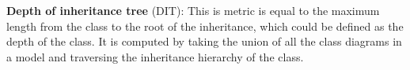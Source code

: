 

\textbf{Depth of inheritance tree} (DIT): This is metric is equal to the maximum length from the class to the root of the inheritance, which could be defined as the depth of the class. It is computed by taking the union of all the class diagrams in a \umlS model and traversing the inheritance hierarchy of the class.

%

